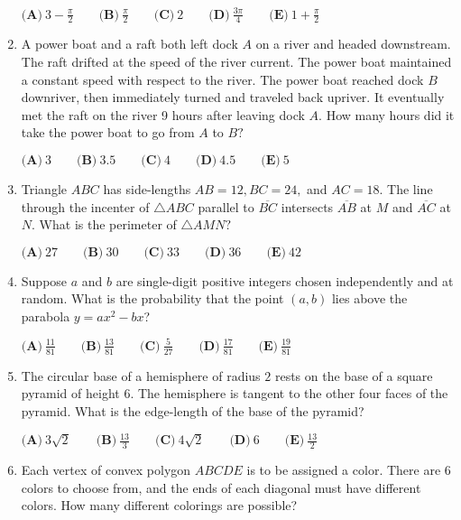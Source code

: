 \documentclass{article}
\begin{document}
\begin{enumerate}[label=\arabic*., itemsep=0.5em]
\(
\textbf{(A)}\ 3 - \frac{\pi}{2} \qquad
\textbf{(B)}\ \frac{\pi}{2} \qquad
\textbf{(C)}\  2 \qquad
\textbf{(D)}\ \frac{3\pi}{4} \qquad
\textbf{(E)}\ 1+\frac{\pi}{2} \)\par \vspace{0.5em}\item A power boat and a raft both left dock \(A\) on a river and headed downstream. The raft drifted at the speed of the river current. The power boat maintained a constant speed with respect to the river. The power boat reached dock \(B\) downriver, then immediately turned and traveled back upriver. It eventually met the raft on the river 9 hours after leaving dock \(A.\) How many hours did it take the power boat to go from \(A\) to \(B?\)

\(
\textbf{(A)}\ 3 \qquad
\textbf{(B)}\ 3.5 \qquad
\textbf{(C)}\  4 \qquad
\textbf{(D)}\ 4.5 \qquad
\textbf{(E)}\ 5 \)\par \vspace{0.5em}\item Triangle \(ABC\) has side-lengths \(AB = 12, BC = 24,\) and \(AC = 18.\) The line through the incenter of \(\triangle ABC\) parallel to \(\overline{BC}\) intersects \(\overline{AB}\) at \(M\) and \(\overline{AC}\) at \(N.\) What is the perimeter of \(\triangle AMN?\)

\(
\textbf{(A)}\ 27 \qquad
\textbf{(B)}\ 30 \qquad
\textbf{(C)}\  33 \qquad
\textbf{(D)}\ 36 \qquad
\textbf{(E)}\ 42 \)\par \vspace{0.5em}\item Suppose \(a\) and \(b\) are single-digit positive integers chosen independently and at random. What is the probability that the point \((a,b)\) lies above the parabola \(y=ax^2-bx\)?

\(
\textbf{(A)}\ \frac{11}{81} \qquad
\textbf{(B)}\ \frac{13}{81} \qquad
\textbf{(C)}\ \frac{5}{27} \qquad
\textbf{(D)}\ \frac{17}{81} \qquad
\textbf{(E)}\ \frac{19}{81} \)\par \vspace{0.5em}\item The circular base of a hemisphere of radius \(2\) rests on the base of a square pyramid of height \(6\). The hemisphere is tangent to the other four faces of the pyramid. What is the edge-length of the base of the pyramid?

\(
\textbf{(A)}\ 3\sqrt{2} \qquad
\textbf{(B)}\ \frac{13}{3} \qquad
\textbf{(C)}\ 4\sqrt{2} \qquad
\textbf{(D)}\ 6 \qquad
\textbf{(E)}\ \frac{13}{2} \)\par \vspace{0.5em}\item Each vertex of convex polygon \(ABCDE\) is to be assigned a color. There are \(6\) colors to choose from, and the ends of each diagonal must have different colors. How many different colorings are possible?


\end{enumerate}
\end{document}
